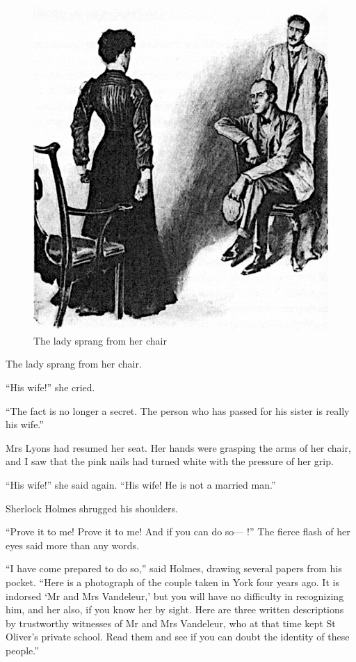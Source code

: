 \documentclass[paper=5.5in:8.5in,BCOR=7mm,twoside,DIV=calc,12pt,usegeometry,openany,chapterprefix,endperiod,headings=big]{scrbook} %
\begin{document}
\begin{figure}[tbh]
\centering
\includegraphics[width=.7\linewidth]{13_sprang}
\caption{The lady sprang from her chair}
\end{figure}

The lady sprang from her chair.

\enquote{His wife!} she cried.

\enquote{The fact is no longer a secret. The person who has passed for his sister is really his wife.}

Mrs Lyons had resumed her seat. Her hands were grasping the arms of her chair, and I saw that the pink nails had turned white with the pressure of her grip.

\enquote{His wife!} she said again. \enquote{His wife! He is not a married man.}

Sherlock Holmes shrugged his shoulders.

\enquote{Prove it to me! Prove it to me! And if you can do so--- !} The fierce flash of her eyes said more than any words.


\enquote{I have come prepared to do so,} said Holmes, drawing several papers from his pocket. \enquote{Here is a photograph of the couple taken in York four years ago. It is indorsed \enquote{Mr and Mrs Vandeleur,} but you will have no difficulty in recognizing him, and her also, if you know her by sight. Here are three written descriptions by trustworthy witnesses of Mr and Mrs Vandeleur, who at that time kept St Oliver's private school. Read them and see if you can doubt the identity of these people.}
\end{document}

